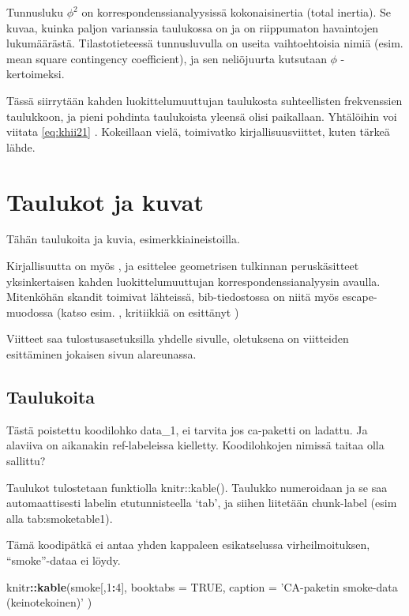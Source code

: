 \documentclass[finnish,]{book}
\newenvironment{Shaded}{\begin{snugshade}}{\end{snugshade}}
\newcommand{\DataTypeTok}[1]{\textcolor[rgb]{0.13,0.29,0.53}{#1}}
\newcommand{\DecValTok}[1]{\textcolor[rgb]{0.00,0.00,0.81}{#1}}
\newcommand{\KeywordTok}[1]{\textcolor[rgb]{0.13,0.29,0.53}{\textbf{#1}}}
\newcommand{\NormalTok}[1]{#1}
\newcommand{\OperatorTok}[1]{\textcolor[rgb]{0.81,0.36,0.00}{\textbf{#1}}}
\newcommand{\OtherTok}[1]{\textcolor[rgb]{0.56,0.35,0.01}{#1}}
\newcommand{\StringTok}[1]{\textcolor[rgb]{0.31,0.60,0.02}{#1}}
\theoremstyle{definition}
\theoremstyle{definition}
\theoremstyle{definition}
\theoremstyle{remark}
\begin{document}
Tunnusluku \(\phi^{2}\) on korrespondenssianalyysissä kokonaisinertia
(total inertia). Se kuvaa, kuinka paljon varianssia taulukossa on ja on
riippumaton havaintojen lukumäärästä. Tilastotieteessä tunnusluvulla on
useita vaihtoehtoisia nimiä (esim. mean square contingency coefficient),
ja sen neliöjuurta kutsutaan \(\phi\) - kertoimeksi.

Tässä siirrytään kahden luokittelumuuttujan taulukosta suhteellisten
frekvenssien taulukkoon, ja pieni pohdinta taulukoista yleensä olisi
paikallaan. Yhtälöihin voi viitata \eqref{eq:khii21} . Kokeillaan vielä,
toimivatko kirjallisuusviittet, kuten tärkeä lähde\citep{RefWorks:55}.

\hypertarget{taulukot-ja-kuvat}{%
\chapter{Taulukot ja kuvat}\label{taulukot-ja-kuvat}}

Tähän taulukoita ja kuvia, esimerkkiaineistoilla.

Kirjallisuutta on myös \citep{RefWorks:68}, ja \citep{RefWorks:57}
esittelee geometrisen tulkinnan peruskäsitteet yksinkertaisen kahden
luokittelumuuttujan korrespondenssianalyysin avaulla. Mitenköhän skandit
toimivat lähteissä, bib-tiedostossa on niitä myös escape-muodossa (katso
esim. \citep{RefWorks:100}, kritiikkiä on esittänyt
\citep{RefWorks:110})

Viitteet saa tulostusasetuksilla yhdelle sivulle, oletuksena on
viitteiden esittäminen jokaisen sivun alareunassa.

\hypertarget{taulukoita}{%
\section{Taulukoita}\label{taulukoita}}

Tästä poistettu koodilohko data\_1, ei tarvita jos ca-paketti on
ladattu. Ja alaviiva on aikanakin ref-labeleissa kielletty.
Koodilohkojen nimissä taitaa olla sallittu?

Taulukot tulostetaan funktiolla knitr::kable(). Taulukko numeroidaan ja
se saa automaattisesti labelin etutunnisteella `tab', ja siihen
liitetään chunk-label (esim alla tab:smoketable1).

Tämä koodipätkä ei antaa yhden kappaleen esikatselussa virheilmoituksen,
``smoke''-dataa ei löydy.

\begin{Shaded}
\begin{Highlighting}[]
\NormalTok{knitr}\OperatorTok{::}\KeywordTok{kable}\NormalTok{(smoke[,}\DecValTok{1}\OperatorTok{:}\DecValTok{4}\NormalTok{], }\DataTypeTok{booktabs =} \OtherTok{TRUE}\NormalTok{,}
  \DataTypeTok{caption =} \StringTok{'CA-paketin smoke-data (keinotekoinen)'}
\NormalTok{)}
\end{Highlighting}
\end{Shaded}
\end{document}
